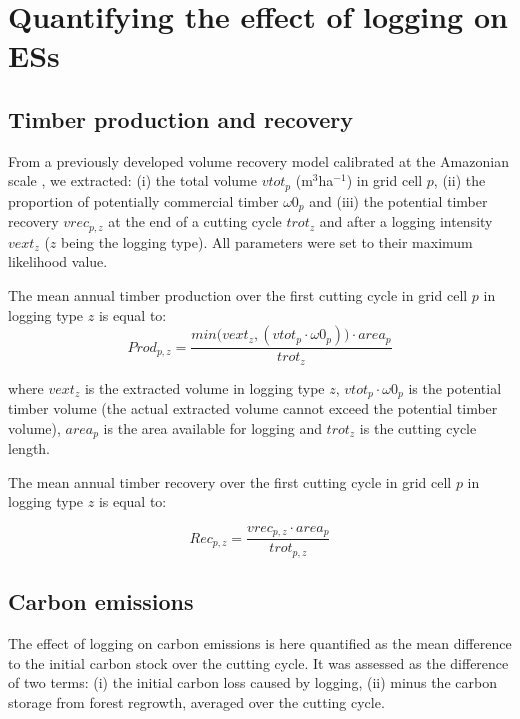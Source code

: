 \documentclass{article}
\begin{document}
\section{Quantifying the effect of logging on ESs}
\label{sec:ESestimation}

\subsection{Timber production and recovery}

From a previously developed volume recovery model calibrated at the Amazonian scale \cite{Piponiotc}, we extracted: (i) the total volume $vtot_p$ (m$^3$ha$^{-1}$) in grid cell $p$, (ii) the proportion of potentially commercial timber $\omega 0_p$ and (iii) the potential timber recovery $vrec_{p,z}$ at the end of a cutting cycle $trot_z$ and after a logging intensity $vext_z$ ($z$ being the logging type). All parameters were set to their maximum likelihood value.

The mean annual timber production over the first cutting cycle in grid cell $p$ in logging type $z$ is equal to: 
\begin{equation}
\label{eq:prod}
    Prod_{p,z}  =  \frac{min\big(vext_z, (vtot_p\cdot \omega 0_p) \big) \cdot area_p}{trot_z}
\end{equation}

where $vext_z$ is the extracted volume in logging type $z$, $vtot_p\cdot \omega 0_p$ is the potential timber volume (the actual extracted volume cannot exceed the potential timber volume), $area_p$ is the area available for logging and $trot_z$ is the cutting cycle length.

The mean annual timber recovery over the first cutting cycle in grid cell $p$ in logging type $z$ is equal to: 

\begin{equation}
\label{eq:rec}
    Rec_{p,z} = \frac{vrec_{p,z}\cdot area_p}{trot_{p,z}}
\end{equation}

\subsection{Carbon emissions}

The effect of logging on carbon emissions is here quantified as the mean difference to the initial carbon stock over the cutting cycle. It was assessed as the difference of two terms: (i) the initial carbon loss caused by logging, (ii) minus the carbon storage from forest regrowth, averaged over the cutting cycle. 
\end{document}
